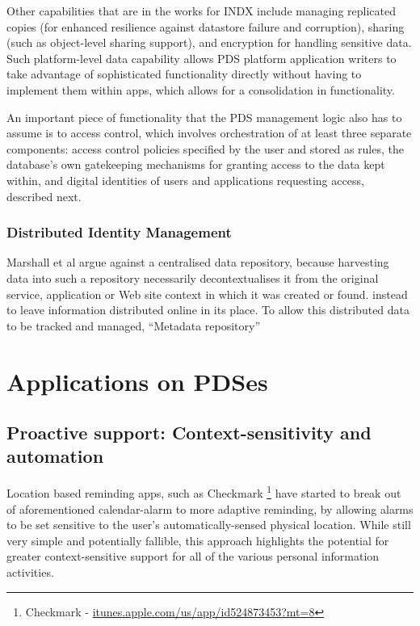 \documentclass[runningheads,a4paper]{llncs}
\begin{document}
Other capabilities that are in the works for INDX include managing replicated copies (for enhanced resilience against datastore failure and corruption), sharing (such as object-level sharing support), and encryption for handling sensitive data.  Such platform-level data capability allows PDS platform application writers to take advantage of sophisticated functionality directly without having to implement them within apps, which allows for a consolidation in functionality.

An important piece of functionality that the PDS management logic also has to assume is to access control, which involves orchestration of at least three separate components: access control policies specified by the user and stored as rules,  the database’s own gatekeeping mechanisms for granting access to the data kept within, and digital identities of users and applications requesting access, described next.

\subsubsection{Distributed Identity Management}

Marshall et al argue against a centralised data repository, because harvesting data into such a repository necessarily decontextualises it from the original service, application or Web site context in which it was created or found. instead to leave information distributed online in its place.  To allow this distributed data to be tracked and managed, “Metadata repository” 

\section{Applications on PDSes}

\subsection{Proactive support: Context-sensitivity and automation}
Location based reminding apps, such as Checkmark \footnote{Checkmark - \url{itunes.apple.com/us/app/id524873453?mt=8}} have started to break out of aforementioned calendar-alarm to more adaptive reminding, by allowing alarms to be set sensitive to the user's automatically-sensed physical location.  While still very simple and potentially fallible, this approach highlights the potential for greater context-sensitive support for all of the various personal information activities.  
\end{document}
